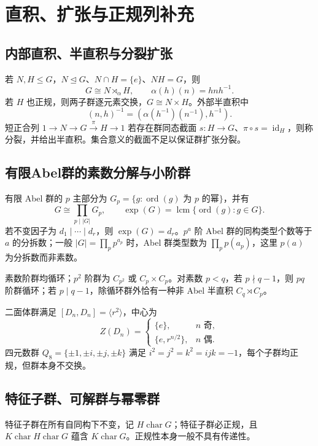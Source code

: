 \documentclass[../main.tex]{subfiles}
\begin{document}
\section{直积、扩张与正规列补充}
\subsection{内部直积、半直积与分裂扩张}
若 $N,H\le G$，$N\trianglelefteq G$、$N\cap H=\{e\}$、$NH=G$，则
\[
G\cong N\rtimes_\alpha H,\qquad \alpha(h)(n)=hnh^{-1}.
\]
若 $H$ 也正规，则两子群逐元素交换，$G\cong N\times H$。外部半直积中
\[
(n,h)^{-1}=(\alpha(h^{-1})(n^{-1}),h^{-1}).
\]
短正合列 $1\to N\to G\xrightarrow{\pi}H\to1$ 若存在群同态截面 $s:H\to G$、$\pi\circ s=\operatorname{id}_H$，则称分裂，并给出半直积。集合意义的截面不足以保证群扩张分裂。

\subsection{有限Abel群的素数分解与小阶群}
有限 Abel 群的 $p$ 主部分为 $G_p=\{g:\operatorname{ord}(g)\text{ 为 }p\text{ 的幂}\}$，并有
\[
G\cong\prod_{p\mid|G|}G_p,\qquad
\exp(G)=\operatorname{lcm}\{\operatorname{ord}(g):g\in G\}.
\]
若不变因子为 $d_1\mid\cdots\mid d_r$，则 $\exp(G)=d_r$。$p^a$ 阶 Abel 群的同构类型个数等于 $a$ 的分拆数；一般 $|G|=\prod_p p^{a_p}$ 时，Abel 群类型数为 $\prod_p p(a_p)$，这里 $p(a)$ 为分拆数而非素数。

素数阶群均循环；$p^2$ 阶群为 $C_{p^2}$ 或 $C_p\times C_p$。对素数 $p<q$，若 $p\nmid q-1$，则 $pq$ 阶群循环；若 $p\mid q-1$，除循环群外恰有一种非 Abel 半直积 $C_q\rtimes C_p$。

二面体群满足 $[D_n,D_n]=\langle r^2\rangle$，中心为
\[
Z(D_n)=\begin{cases}\{e\},&n\text{ 奇},\\\{e,r^{n/2}\},&n\text{ 偶}.\end{cases}
\]
四元数群 $Q_8=\{\pm1,\pm i,\pm j,\pm k\}$ 满足 $i^2=j^2=k^2=ijk=-1$，每个子群均正规，但群本身不交换。

\subsection{特征子群、可解群与幂零群}
特征子群在所有自同构下不变，记 $H\operatorname{char}G$；特征子群必正规，且 $K\operatorname{char}H\operatorname{char}G$ 蕴含 $K\operatorname{char}G$。正规性本身一般不具有传递性。
\end{document}
